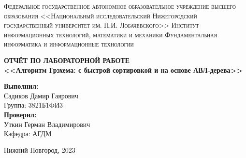 \begin{titlepage}
	\begin{center}
		\textsc{
			Федеральное государственное автономное образовательное учреждение высшего образования <<Национальный исследовательский Нижегородский государственный университет им. Н.И. Лобачевского>>
			\vspace{5pt}
			\break Институт информационных технологий, математики и механики
			\vspace{5pt}
			\break Фундаментальная информатика и информационные технологии
		}
	\end{center}
	\vspace{150pt}
	\begin{center}
		\textbf{\Large ОТЧЁТ ПО ЛАБОРАТОРНОЙ РАБОТЕ}\\
		\vspace{15pt}
		\textbf{\large <<Алгоритм Грэхема: с быстрой сортировкой и на основе АВЛ-дерева>>}\\
		\vspace{10pt}
	\end{center}
	\vspace{175pt}
	
    \hfill
	\begin{minipage}{0.45\textwidth}
		\large
		\textbf{Выполнил:\\}
		Садиков Дамир Гаярович\\
		Группа: 3821Б1ФИ3\\
		
		\textbf{Проверил:\\} 
		Уткин Герман Владимирович\\
		Кафедра: АГДМ
	\end{minipage}
	\vfill
	\begin{center}
		Нижний Новгород, 2023
	\end{center}
\end{titlepage}
